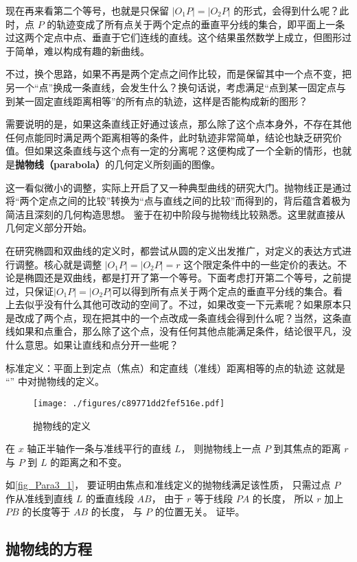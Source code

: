 现在再来看第二个等号，也就是只保留 $|O_1P| = |O_2P|$ 的形式，会得到什么呢？此时，点 $P$ 的轨迹变成了所有点关于两个定点的垂直平分线的集合，即平面上一条过这两个定点中点、垂直于它们连线的直线。这个结果虽然数学上成立，但图形过于简单，难以构成有趣的新曲线。

不过，换个思路，如果不再是两个定点之间作比较，而是保留其中一个点不变，把另一个“点”换成一条直线，会发生什么？换句话说，考虑满足“点到某一固定点与到某一固定直线距离相等”的所有点的轨迹，这样是否能构成新的图形？

需要说明的是，如果这条直线正好通过该点，那么除了这个点本身外，不存在其他任何点能同时满足两个距离相等的条件，此时轨迹非常简单，结论也缺乏研究价值。但如果这条直线与这个点有一定的分离呢？这便构成了一个全新的情形，也就是\textbf{抛物线（parabola）}的几何定义所刻画的图像。

这一看似微小的调整，实际上开启了又一种典型曲线的研究大门。抛物线正是通过将“两个定点之间的比较”转换为“点与直线之间的比较”而得到的，背后蕴含着极为简洁且深刻的几何构造思想。
鉴于在初中阶段与抛物线比较熟悉。这里就直接从几何定义部分开始。

在研究椭圆和双曲线的定义时，都尝试从圆的定义出发推广，对定义的表达方式进行调整。核心就是调整 $|O_1P| = |O_2P| = r$ 这个限定条件中的一些定价的表达。不论是椭圆还是双曲线，都是打开了第一个等号。下面考虑打开第二个等号，之前提过，只保证$|O_1P| = |O_2P|$可以得到所有点关于两个定点的垂直平分线的集合。看上去似乎没有什么其他可改动的空间了。不过，如果改变一下元素呢？如果原本只是改成了两个点，现在把其中的一个点改成一条直线会得到什么呢？当然，这条直线如果和点重合，那么除了这个点，没有任何其他点能满足条件，结论很平凡，没什么意思。如果让直线和点分开一些呢？



标准定义：平面上到定点（焦点）和定直线（准线）距离相等的点的轨迹
这就是 “” 中对抛物线的定义。
\begin{figure}[ht]
\centering
\texttt{[image: ./figures/c89771dd2fef516e.pdf]}
\caption{抛物线的定义} \label{fig_Para3_1}
\end{figure}

在 $x$ 轴正半轴作一条与准线平行的直线 $L$， 则抛物线上一点 $P$ 到其焦点的距离 $r$ 与 $P$ 到 $L$ 的距离之和不变。

如\autoref{fig_Para3_1}， 要证明由焦点和准线定义的抛物线满足该性质， 只需过点 $P$ 作从准线到直线 $L$ 的垂直线段 $AB$， 由于 $r$ 等于线段 $PA$ 的长度， 所以 $r$ 加上 $PB$ 的长度等于 $AB$ 的长度， 与 $P$ 的位置无关。 证毕。


\subsection{抛物线的方程}

